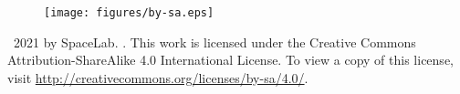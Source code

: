 \vfill

\begin{figure}[!h]
	\begin{center}
		\texttt{[image: figures/by-sa.eps]}
	\end{center}
\end{figure}

\textcopyright\  2021 by SpaceLab. \thetitle. This work is licensed under the Creative Commons Attribution-ShareAlike 4.0 International License. To view a copy of this license, visit \href{http://creativecommons.org/licenses/by-sa/4.0/}{http://creativecommons.org/licenses/by-sa/4.0/}.
